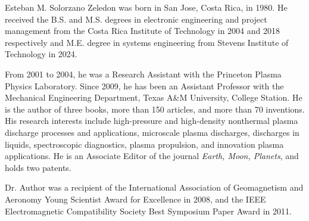 \documentclass{IEEEoj}
\begin{document}
\begin{IEEEbiography}{Esteban M. Solorzano Zeledon} was born in San Jose, Costa Rica, in 
1980. He received the B.S. and M.S. degrees in electronic engineering and project management from 
the Costa Rica Institute of Technology in 2004 and 2018 respectively and M.E. degree in 
systems engineering from Stevens Institute of Technology in 2024.

From 2001 to 2004, he was a Research Assistant with the Princeton Plasma 
Physics Laboratory. Since 2009, he has been an Assistant Professor with the 
Mechanical Engineering Department, Texas A{\&}M University, College Station. 
He is the author of three books, more than 150 articles, and more than 70 
inventions. His research interests include high-pressure and high-density 
nonthermal plasma discharge processes and applications, microscale plasma 
discharges, discharges in liquids, spectroscopic diagnostics, plasma 
propulsion, and innovation plasma applications. He is an Associate Editor of 
the journal \emph{Earth, Moon, Planets}, and holds two patents. 

Dr. Author was a recipient of the International Association of Geomagnetism 
and Aeronomy Young Scientist Award for Excellence in 2008, and the IEEE 
Electromagnetic Compatibility Society Best Symposium Paper Award in 2011. 
\end{IEEEbiography}
\end{document}

